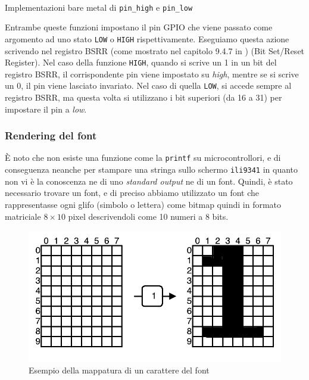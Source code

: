 \documentclass[a4paper]{article}
\begin{document}
\begin{Listing}
    \centering
    \mbox{
        \quad
    }
    \caption{Implementazioni bare metal di \texttt{pin\_high} e \texttt{pin\_low}}
    \label{bare_metal_pins}
\end{Listing}

Entrambe queste funzioni impostano il pin GPIO che viene passato come argomento ad
uno stato \texttt{LOW} o \texttt{HIGH} rispettivamente.  Eseguiamo questa azione scrivendo
nel registro BSRR (come mostrato nel capitolo 9.4.7 in \cite{STM32F334xx}) (Bit Set/Reset Register).
Nel caso della funzione \texttt{HIGH}, quando si scrive un 1 in un bit del registro BSRR,
il corrispondente pin viene impostato su \textit{high}, mentre se si scrive un 0, il pin viene
lasciato invariato. Nel caso di quella \texttt{LOW}, si accede sempre al registro BSRR,
ma questa volta si utilizzano i bit superiori (da 16 a 31) per impostare il pin a \textit{low}.

\subsubsection{Rendering del font}

È noto che non esiste una funzione come la \texttt{printf} su microcontrollori, e di conseguenza
neanche per stampare una stringa sullo schermo \texttt{ili9341} in quanto non vi è la conoscenza
ne di uno \textit{standard output} ne di un font. Quindi, è stato necessario trovare un font,
e di preciso abbiamo utilizzato un font che rappresentasse ogni glifo (simbolo o lettera) come
bitmap quindi in formato matriciale $8 \times 10$ pixel descrivendoli come 10 numeri a 8 bits.

\begin{figure}[h!t]
    \begin{center}
        \includegraphics[scale=0.5]{./figures/matrix_font.pdf}
    \end{center}
    \caption{Esempio della mappatura di un carattere del font}
    \label{fig:matrix_font}
\end{figure}
\end{document}
